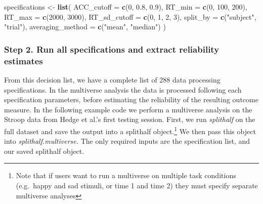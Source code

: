 \documentclass[
  english,
  man,floatsintext]{apa6}
\newenvironment{Shaded}{\begin{snugshade}}{\end{snugshade}}
\newcommand{\DataTypeTok}[1]{\textcolor[rgb]{0.13,0.29,0.53}{#1}}
\newcommand{\DecValTok}[1]{\textcolor[rgb]{0.00,0.00,0.81}{#1}}
\newcommand{\FloatTok}[1]{\textcolor[rgb]{0.00,0.00,0.81}{#1}}
\newcommand{\KeywordTok}[1]{\textcolor[rgb]{0.13,0.29,0.53}{\textbf{#1}}}
\newcommand{\NormalTok}[1]{#1}
\newcommand{\StringTok}[1]{\textcolor[rgb]{0.31,0.60,0.02}{#1}}
\begin{document}
\begin{Shaded}
\begin{Highlighting}[]
\NormalTok{specifications <-}\StringTok{ }\KeywordTok{list}\NormalTok{(}
 \DataTypeTok{ACC_cutoff =} \KeywordTok{c}\NormalTok{(}\DecValTok{0}\NormalTok{, }\FloatTok{0.8}\NormalTok{, }\FloatTok{0.9}\NormalTok{),  }
 \DataTypeTok{RT_min           =} \KeywordTok{c}\NormalTok{(}\DecValTok{0}\NormalTok{, }\DecValTok{100}\NormalTok{, }\DecValTok{200}\NormalTok{),}
 \DataTypeTok{RT_max            =} \KeywordTok{c}\NormalTok{(}\DecValTok{2000}\NormalTok{, }\DecValTok{3000}\NormalTok{),}
 \DataTypeTok{RT_sd_cutoff      =} \KeywordTok{c}\NormalTok{(}\DecValTok{0}\NormalTok{, }\DecValTok{1}\NormalTok{, }\DecValTok{2}\NormalTok{, }\DecValTok{3}\NormalTok{),}
 \DataTypeTok{split_by          =} \KeywordTok{c}\NormalTok{(}\StringTok{"subject"}\NormalTok{, }\StringTok{"trial"}\NormalTok{), }
 \DataTypeTok{averaging_method  =} \KeywordTok{c}\NormalTok{(}\StringTok{"mean"}\NormalTok{, }\StringTok{"median"}\NormalTok{)}
\NormalTok{)}
\end{Highlighting}
\end{Shaded}

\hypertarget{step-2.-run-all-specifications-and-extract-reliability-estimates}{%
\subsubsection{Step 2. Run all specifications and extract reliability estimates}\label{step-2.-run-all-specifications-and-extract-reliability-estimates}}

From this decision list, we have a complete list of 288 data processing specifications. In the multiverse analysis the data is processed following each specification parameters, before estimating the reliability of the resulting outcome measure. In the following example code we perform a multiverse analysis on the Stroop data from Hedge et al.'s first testing session. First, we run \emph{splithalf} on the full dataset and save the output into a splithalf object.\footnote{Note that if users want to run a multiverse on multiple task conditions (e.g.~happy and sad stimuli, or time 1 and time 2) they must specify separate multiverse analyses} We then pass this object into \emph{splithalf.multiverse.} The only required inputs are the specification list, and our saved splithalf object.
\end{document}
